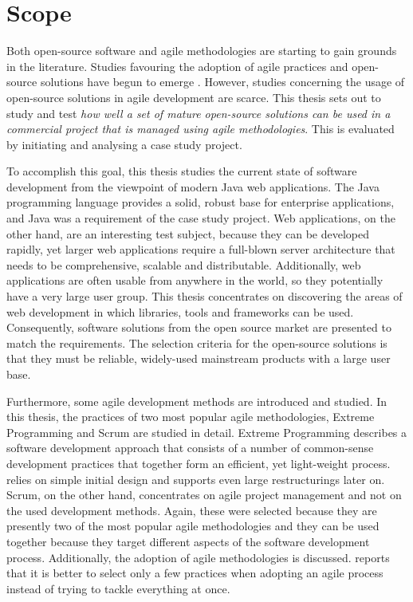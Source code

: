 \section{Scope}
\label{toc:intro:scope}

Both open-source software and agile methodologies are starting to gain 
grounds in the literature. Studies favouring the adoption of agile 
practices and open-source solutions have begun to emerge 
\citep{agileadoption,usingoss}. However, studies concerning the usage 
of open-source solutions in agile development are scarce. This thesis 
sets out to study and test \textsl{how well a set of mature 
open-source solutions can be used in a commercial project that is 
managed using agile methodologies}. This is evaluated by initiating 
and analysing a case study project.

To accomplish this goal, this thesis studies the current state of 
software development from the viewpoint of modern Java web 
applications. The Java programming language provides a solid, robust 
base for enterprise applications, and Java was a requirement of the 
case study project. Web applications, on the other hand, are an 
interesting test subject, because they can be developed rapidly, yet 
larger web applications require a full-blown server architecture that 
needs to be comprehensive, scalable and distributable. Additionally, 
web applications are often usable from anywhere in the world, so they 
potentially have a very large user group. This thesis concentrates on 
discovering the areas of web development in which libraries, tools and 
frameworks can be used. Consequently, software solutions from the open 
source market are presented to match the requirements. The selection 
criteria for the open-source solutions is that they must be reliable, 
widely-used mainstream products with a large user base.

Furthermore, some agile development methods are introduced and 
studied. In this thesis, the practices of two most popular agile 
methodologies, Extreme Programming \citep{xpexplained} and Scrum 
\citep{scrumprocess} are studied in detail. Extreme Programming 
describes a software development approach that consists of a number of 
common-sense development practices that together form an efficient, 
yet light-weight process.  relies on simple initial design 
and supports even large restructurings later on. Scrum, on the other 
hand, concentrates on agile project management and not on the used 
development methods. Again, these were selected because they are 
presently two of the most popular agile methodologies 
\citep{rapidxp,agilesdm} and they can be used together because they 
target different aspects of the software development process. 
Additionally, the adoption of agile methodologies is discussed. 
\cite{agileadoption} reports that it is better to select only a few 
practices when adopting an agile process instead of trying to tackle 
everything at once.

